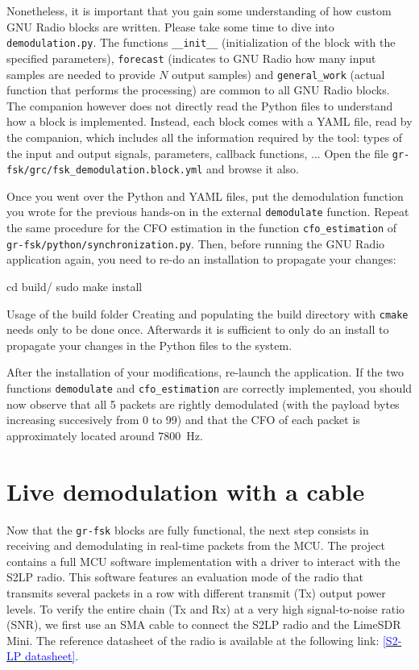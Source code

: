 Nonetheless, it is important that you gain some understanding of how custom GNU Radio blocks are written.
Please take some time to dive into \texttt{demodulation.py}. The functions \texttt{\_\_init\_\_} (initialization of the block with the specified parameters),
\texttt{forecast} (indicates to GNU Radio how many input samples are needed to provide $N$ output samples) and \texttt{general\_work} (actual function that performs the processing) are common to all GNU Radio blocks.
The companion however does not directly read the Python files to understand how a block is implemented. Instead, each block comes with a
YAML file, read by the companion, which includes all the information required by the tool: types of the input and output signals, parameters,
callback functions, ... Open the file \texttt{gr-fsk/grc/fsk\_demodulation.block.yml} and browse it also.

Once you went over the Python and YAML files, put the demodulation function you wrote for the previous hands-on in the external \texttt{demodulate} function. Repeat the same procedure for the CFO estimation in the function
\texttt{cfo\_estimation} of \texttt{gr-fsk/python/synchronization.py}. Then, before running the GNU Radio application again, you need to re-do an installation to propagate your changes:
\begin{bash}
    cd build/
    sudo make install
\end{bash}
\begin{bclogo}[couleur = gray!20, arrondi = 0.2, logo=\bcinfo]{Usage of the build folder}
    Creating and populating the build directory with \texttt{cmake} needs only to be done once.
    Afterwards it is sufficient to only do an install to propagate your changes in the Python files to the system.
\end{bclogo}

After the installation of your modifications, re-launch the application.
If the two functions \texttt{demodulate} and \texttt{cfo\_estimation} are correctly implemented, you should now observe that all 5 packets are rightly demodulated (with the payload bytes increasing succesively from 0 to 99)
and that the CFO of each packet is approximately located around \SI{7800}{\hertz}.

\section{Live demodulation with a cable}

Now that the \texttt{gr-fsk} blocks are fully functional, the next step consists in receiving and demodulating in real-time packets from the MCU.
The project contains a full MCU software implementation with a driver to interact with the S2LP radio.
This software features an evaluation mode of the radio that transmits several packets in a row with different transmit (Tx) output power levels.
To verify the entire chain (Tx and Rx) at a very high signal-to-noise ratio (SNR), we first use an SMA cable to connect the S2LP radio and the LimeSDR Mini.
The reference datasheet of the radio is available at the following link: \href{https://www.st.com/resource/en/datasheet/s2-lp.pdf}{\textcolor{blue}{[S2-LP datasheet]}}.

